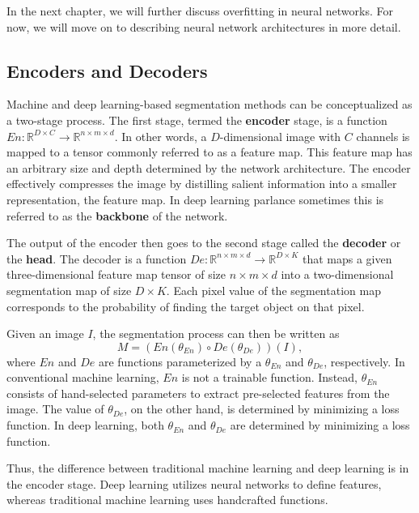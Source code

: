 In the next chapter, we will further discuss overfitting in neural networks. For now, we will move on to describing neural network architectures in more detail.

\subsection{Encoders and Decoders}

Machine and deep learning-based segmentation methods can be conceptualized as a two-stage process. The first stage, termed the \textbf{encoder} stage, is a function $En : \mathbb{R}^{D \times C} \rightarrow \mathbb{R}^{n \times m \times d}$. In other words, a $D$-dimensional image with $C$ channels is mapped to a tensor commonly referred to as a feature map. This feature map has an arbitrary size and depth determined by the network architecture. The encoder effectively compresses the image by distilling salient information into a smaller representation, the feature map. In deep learning parlance sometimes this is referred to as the \textbf{backbone} of the network.

The output of the encoder then goes to the second stage called the \textbf{decoder} or the \textbf{head}. The decoder is a function $De : \mathbb{R}^{n \times m \times d} \rightarrow \mathbb{R}^{D \times K}$ that maps a given three-dimensional feature map tensor of size $n \times m \times d$ into a two-dimensional segmentation map of size $D \times K$. Each pixel value of the segmentation map corresponds to the probability of finding the target object on that pixel.

Given an image $I$, the segmentation process can then be written as
\begin{equation}
M = (En(\theta_{En}) \circ De(\theta_{De}))(I),
\end{equation}
where $En$ and $De$ are functions parameterized by a $\theta_{En}$ and $\theta_{De}$, respectively. In conventional machine learning, $En$ is not a trainable function. Instead, $\theta_{En}$ consists of hand-selected parameters to extract pre-selected features from the image. The value of $\theta_{De}$, on the other hand, is determined by minimizing a loss function. In deep learning, both $\theta_{En}$ and $\theta_{De}$ are determined by minimizing a loss function.

Thus, the difference between traditional machine learning and deep learning is in the encoder stage. Deep learning utilizes neural networks to define features, whereas traditional machine learning uses handcrafted functions.

